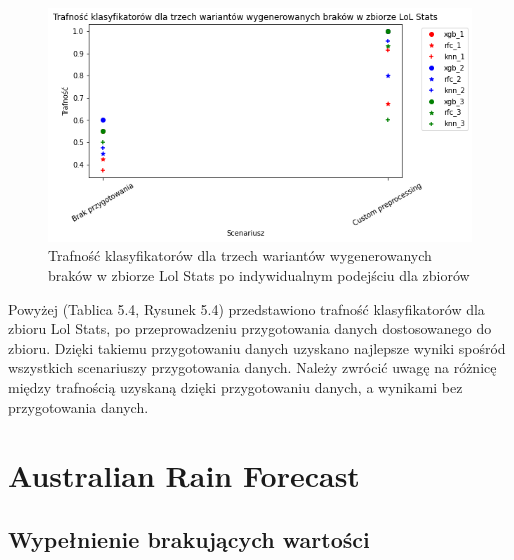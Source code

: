 \documentclass{book}
\begin{document}
    \begin{figure}[H]
        \centerline{\includegraphics[scale=0.8]{Lol_stats_Custom}}
        \centering
        \caption{Trafność klasyfikatorów dla trzech wariantów wygenerowanych braków w zbiorze Lol Stats po indywidualnym podejściu dla zbiorów}
        \end{figure}


Powyżej (Tablica 5.4, Rysunek 5.4) przedstawiono 
trafność klasyfikatorów dla zbioru Lol Stats, 
po przeprowadzeniu przygotowania danych dostosowanego do zbioru.
Dzięki takiemu przygotowaniu danych uzyskano najlepsze wyniki 
spośród wszystkich scenariuszy przygotowania danych. 
Należy zwrócić uwagę na różnicę między trafnością uzyskaną
dzięki przygotowaniu danych, a wynikami bez przygotowania danych.

\section{Australian Rain Forecast}


\subsection{Wypełnienie brakujących wartości}
\end{document}
